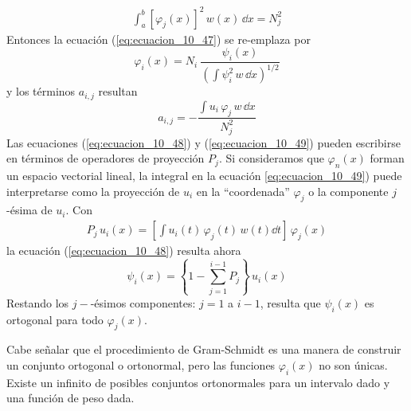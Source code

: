 \begin{align*}
\int_{a}^{b} \left[ \varphi_{j} (x) \right]^{2} \, w(x) \, \dd{x} =  N_{j}^{2}
\end{align*}
Entonces la ecuación (\ref{eq:ecuacion_10_47}) se re-emplaza por
\begin{equation}
\varphi_{i}(x) =  N_{i} \: \dfrac{\psi_{i}(x)}{\left( \displaystyle \int \psi_{i}^{2} \, w \, \dd{x} \right)^{1/2}}
\label{eq:ecuacion_10_47a}
\end{equation}
y los términos $a_{i,j}$ resultan
\begin{equation}
a_{i, j} = - \dfrac{ \displaystyle \int u_{i} \, \varphi_{j} \, w \, \dd{x}}{N_{j}^{2}}
\label{eq:ecuacion_10_49a}
\end{equation}
Las ecuaciones (\ref{eq:ecuacion_10_48}) y (\ref{eq:ecuacion_10_49}) pueden escribirse en términos de operadores de proyección $P_{j}$. Si consideramos que $\varphi_{n}(x)$ forman un espacio vectorial lineal, la integral en la ecuación \ref{eq:ecuacion_10_49}) puede interpretarse como la proyección de $u_{i}$ en la \enquote{coordenada} $\varphi_{j}$ o la componente $j$-ésima de $u_{i}$. Con
\begin{align*}
P_{j} \, u_{i}(x) = \left[ \int u_{i}(t) \, \varphi_{j}(t) \, w(t) \dd{t} \right]\, \varphi_{j}(x)
\end{align*}
la ecuación (\ref{eq:ecuacion_10_48}) resulta ahora
\begin{equation}
\psi_{i}(x) = \left\{ 1 - \sum_{j=1}^{i-1} P_{j} \right\} \, u_{i}(x)
\label{eq:ecuacion_10_48a}
\end{equation}
Restando los $j-$-ésimos componentes: $j=1$ a $i-1$, resulta que $\psi_{i}(x)$ es ortogonal para todo $\varphi_{j}(x)$.
\par
 Cabe señalar que el procedimiento de Gram-Schmidt es una manera de construir un conjunto ortogonal o ortonormal, pero las funciones $\varphi_{i}(x)$ no son únicas. Existe un infinito de posibles conjuntos ortonormales para un intervalo dado y una función de peso dada.
